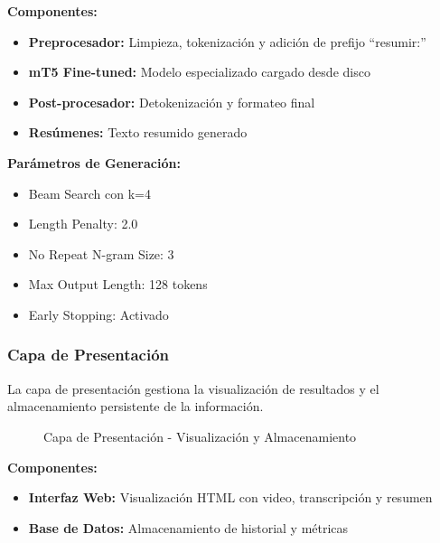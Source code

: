 \documentclass[12pt,a4paper]{article}
\begin{document}
\textbf{Componentes:}
\begin{itemize}
    \item \textbf{Preprocesador:} Limpieza, tokenización y adición de prefijo ``resumir:''
    \item \textbf{mT5 Fine-tuned:} Modelo especializado cargado desde disco
    \item \textbf{Post-procesador:} Detokenización y formateo final
    \item \textbf{Resúmenes:} Texto resumido generado
\end{itemize}

\textbf{Parámetros de Generación:}
\begin{itemize}
    \item Beam Search con k=4
    \item Length Penalty: 2.0
    \item No Repeat N-gram Size: 3
    \item Max Output Length: 128 tokens
    \item Early Stopping: Activado
\end{itemize}

\newpage

\subsubsection{Capa de Presentación}

La capa de presentación gestiona la visualización de resultados y el almacenamiento persistente de la información.

\begin{figure}[H]
    \centering
    \caption{Capa de Presentación - Visualización y Almacenamiento}
    \label{fig:capa_presentacion}
\end{figure}

\textbf{Componentes:}
\begin{itemize}
    \item \textbf{Interfaz Web:} Visualización HTML con video, transcripción y resumen
    \item \textbf{Base de Datos:} Almacenamiento de historial y métricas
\end{itemize}
\end{document}
